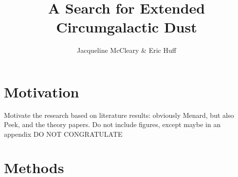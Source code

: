 \documentclass[11pt, oneside]{article}   	%
\title{A Search for  Extended Circumgalactic Dust}
\author{Jacqueline McCleary \& Eric Huff}
\begin{document}
\maketitle


\section{Motivation\label{sec:intro}}
\begin{outline}
\1 Motivate the research based on literature results: obviously Menard, but also Peek, and the theory papers. Do not include figures, except maybe in an appendix
\1 DO NOT CONGRATULATE
\end{outline}


\section{Methods\label{sec:methods}}
\end{document}
